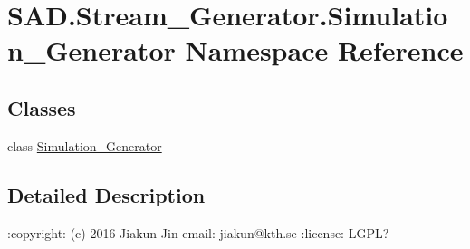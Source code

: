 \hypertarget{namespaceSAD_1_1Stream__Generator_1_1Simulation__Generator}{}\section{S\+A\+D.\+Stream\+\_\+\+Generator.\+Simulation\+\_\+\+Generator Namespace Reference}
\label{namespaceSAD_1_1Stream__Generator_1_1Simulation__Generator}
\subsection*{Classes}
\begin{DoxyCompactItemize}
\item 
class \hyperlink{classSAD_1_1Stream__Generator_1_1Simulation__Generator_1_1Simulation__Generator}{Simulation\+\_\+\+Generator}
\end{DoxyCompactItemize}


\subsection{Detailed Description}
\begin{DoxyVerb}:copyright: (c) 2016 Jiakun Jin
email: jiakun@kth.se
:license: LGPL?
\end{DoxyVerb}
 